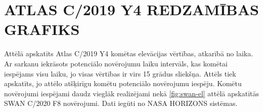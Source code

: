 \documentclass[12pt,paper=a4]{report}
\begin{document}











\appendix
\chapter{ATLAS C/2019 Y4 REDZAMĪBAS GRAFIKS}


Attēlā apskatīts Atlas C/2019 Y4 komētas elevācijas vērtības, atkarībā no laika. Ar sarkanu iekrāsots potenciālo novērojumu laiku intervāls, kas komētai iespējams visu laiku, jo visas vērtības ir virs 15 grādus sliekšņa. Attēls tiek apskatīts, jo attēlo atšķirīgu komētu potenciālo novērojumu iespēju. Komētu novērojumi iespējami daudz vieglāk realizējami nekā \ref{fig:swan-el} attēlā apskatītās SWAN  C/2020 F8 novērojumi. Dati iegūti no NASA HORIZONS sistēmas.
\end{document}
